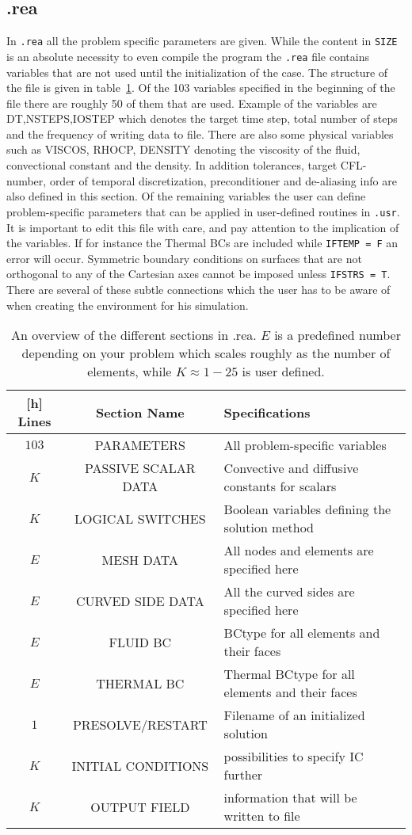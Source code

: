\subsection{.rea}
In \verb|.rea| all the problem specific parameters are given. While the content in \verb|SIZE| 
is an absolute necessity to even compile the program the \verb|.rea| file contains variables 
that are not used until the initialization of the case. The structure of the file is given in table~\ref{tab:reafile}.
Of the 103 variables specified in the beginning of the file there are roughly 50 of them that are used. Example of the variables
are DT,NSTEPS,IOSTEP which denotes the target time step, total number of steps and the frequency of writing data to file. 
There are also some physical variables such as VISCOS, RHOCP, DENSITY denoting the viscosity of the fluid, convectional constant and 
the density. In addition tolerances, target CFL-number, order of temporal discretization, 
preconditioner and de-aliasing info are also defined in this section.
Of the remaining variables the user can define problem-specific parameters that 
can be applied in user-defined routines in \verb|.usr|.
It is important to edit this file with care, and pay attention to the implication of the 
variables. If for instance the Thermal BCs are included while \verb|IFTEMP = F| an error 
will occur. Symmetric boundary conditions on surfaces that are not orthogonal to any of the 
Cartesian axes cannot be imposed unless \verb|IFSTRS = T|. There are several of these subtle
connections which the user has to be aware of when creating the environment for his simulation.
%
\begin{table}
    \centering
    \begin{tabular}{c c l}[h]
       Lines & Section Name & Specifications \\ \hline
       $103$ & PARAMETERS & All problem-specific variables \\ 
       $K$ & PASSIVE SCALAR DATA & Convective and diffusive constants for scalars\\ 
       $K$ & LOGICAL SWITCHES & Boolean variables defining the solution method \\ 
       $E$ & MESH DATA & All nodes and elements are specified here\\
       $E$ & CURVED SIDE DATA & All the curved sides are specified here\\
       $E$ & FLUID BC& BCtype for all elements and their faces\\
       $E$ & THERMAL BC& Thermal BCtype for all elements and their faces\\
       $1$ & PRESOLVE/RESTART & Filename of an initialized solution \\
       $K$ & INITIAL CONDITIONS & possibilities to specify IC further \\
       $K$ & OUTPUT FIELD & information that will be written to file \\
    \end{tabular}
    \caption{An overview of the different sections in .rea. $E$ is a predefined number depending on your problem
    which scales roughly as the number of elements, while $K\approx 1-25$ is user defined.}
    \label{tab:reafile}
\end{table}
%
